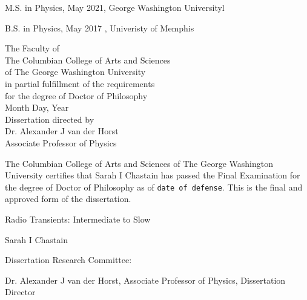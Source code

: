 \documentclass[12pt]{article}
\begin{document}
\thispagestyle{empty}
\vspace*{1in}
\begin{center}
\centerline{M.S. in Physics, May 2021, George Washington Universityl}
\centerline{B.S. in Physics, May 2017 , Univeristy of Memphis}\vspace*{24pt}
\begin{center}
The Faculty of\\The Columbian College of Arts and Sciences \\ of The George
Washington University\\ in partial fulfillment of the requirements\\ for the degree
of Doctor of Philosophy\\[36pt]
Month Day, Year\\[36pt] %
Dissertation directed by\\[\baselineskip]
Dr. Alexander J van der Horst\\
Associate Professor of Physics\\[\baselineskip]
\end{center}
\end{center}
\pagestyle{plain}
\setcounter{page}{1}
\newpage
\begin{doublespace}
\noindent
The Columbian College of Arts and Sciences of The George Washington University certifies that Sarah I Chastain has passed the Final Examination for the degree of Doctor of Philosophy as of \texttt{date of defense}. This is the final and approved form of the dissertation.
\end{doublespace}
\vspace{12pt}
\begin{center}
Radio Transients: Intermediate to Slow

\vspace*{36pt}
Sarah I Chastain
\vspace{24pt}
\end{center}
Dissertation Research Committee:
\vspace{12pt}

\indent Dr. Alexander J van der Horst, Associate Professor of Physics, Dissertation Director
\vspace{12pt}
\end{document}

